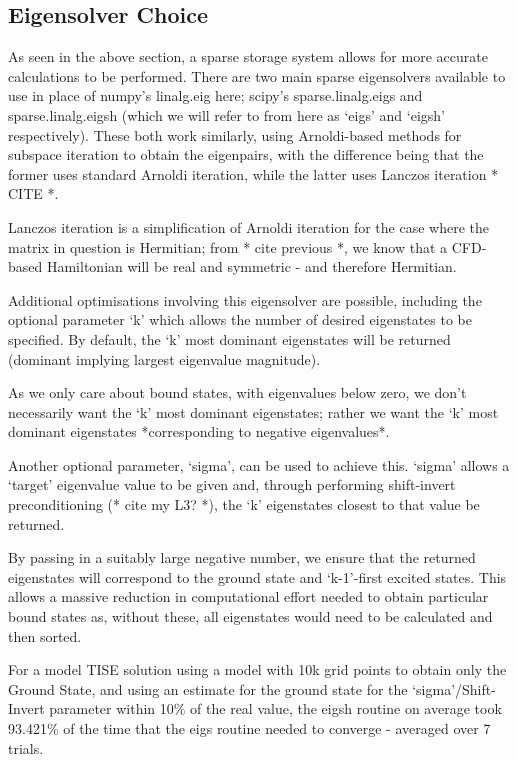 \subsection{Eigensolver Choice}
As seen in the above section, a sparse storage system allows for more accurate calculations to be performed. There are two main sparse eigensolvers available to use in place of numpy's linalg.eig here; scipy's sparse.linalg.eigs and sparse.linalg.eigsh (which we will refer to from here as `eigs' and `eigsh' respectively). These both work similarly, using Arnoldi-based methods for subspace iteration to obtain the eigenpairs, with the difference being that the former uses standard Arnoldi iteration, while the latter uses Lanczos iteration * CITE *. 

Lanczos iteration is a simplification of Arnoldi iteration for the case where the matrix in question is Hermitian; from * cite previous *, we know that a CFD-based Hamiltonian will be real and symmetric - and therefore Hermitian. 

Additional optimisations involving this eigensolver are possible, including the optional parameter `k' which allows the number of desired eigenstates to be specified. By default, the `k' most dominant eigenstates will be returned (dominant implying largest eigenvalue magnitude). 

As we only care about bound states, with eigenvalues below zero, we don't necessarily want the `k' most dominant eigenstates; rather we want the `k' most dominant eigenstates *corresponding to negative eigenvalues*. 

Another optional parameter, `sigma', can be used to achieve this. `sigma' allows a `target' eigenvalue value to be given and, through performing shift-invert preconditioning (* cite my L3? *), the `k' eigenstates closest to that value be returned. 

By passing in a suitably large negative number, we ensure that the returned eigenstates will correspond to the ground state and `k-1'-first excited states. This allows a massive reduction in computational effort needed to obtain particular bound states as, without these, all eigenstates would need to be calculated and then sorted. 

For a model TISE solution using a model with 10k grid points to obtain only the Ground State, and using an estimate for the ground state for the `sigma'/Shift-Invert parameter within 10\% of the real value, the eigsh routine on average took 93.421\% of the time that the eigs routine needed to converge - averaged over 7 trials. 

